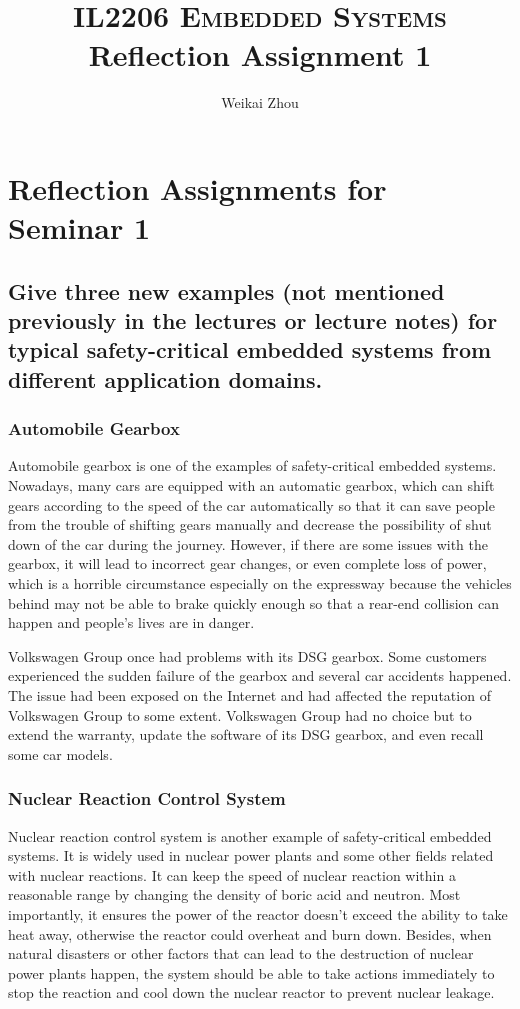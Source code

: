 \documentclass[10pt]{article}
\title{{\normalsize\textsc {IL2206 Embedded Systems}} \\ Reflection Assignment 1}
\author{Weikai Zhou}
\date{}
\begin{document}
\maketitle

\section{Reflection Assignments for Seminar 1}

\subsection{Give three new examples (not mentioned previously in the lectures or lecture notes) for typical safety-critical embedded systems from different application domains.}

\subsubsection{Automobile Gearbox}

Automobile gearbox is one of the examples of safety-critical embedded systems. Nowadays, many cars are equipped with an automatic gearbox, which can shift gears according to the speed of the car automatically so that it can save people from the trouble of shifting gears manually and decrease the possibility of shut down of the car during the journey. However, if there are some issues with the gearbox, it will lead to incorrect gear changes, or even complete loss of power, which is a horrible circumstance especially on the expressway because the vehicles behind may not be able to brake quickly enough so that a rear-end collision can happen and people's lives are in danger. 

Volkswagen Group once had problems with its DSG gearbox. Some customers experienced the sudden failure of the gearbox and several car accidents happened. The issue had been exposed on the Internet and had affected the reputation of Volkswagen Group to some extent. Volkswagen Group had no choice but to extend the warranty, update the software of its DSG gearbox, and even recall some car models.

\subsubsection{Nuclear Reaction Control System}

Nuclear reaction control system is another example of safety-critical embedded systems. It is widely used in nuclear power plants and some other fields related with nuclear reactions. It can keep the speed of nuclear reaction within a reasonable range by changing the density of boric acid and neutron. Most importantly, it ensures the power of the reactor doesn't exceed the ability to take heat away, otherwise the reactor could overheat and burn down. Besides, when natural disasters or other factors that can lead to the destruction of nuclear power plants happen, the system should be able to take actions immediately to stop the reaction and cool down the nuclear reactor to prevent nuclear leakage.
\end{document}
